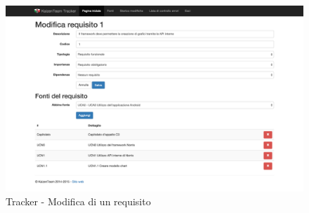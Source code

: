 \begin{figure}[H]
	\centering
	\includegraphics[width=\textwidth]{Pics/TrackerModificaRequisito}
	\caption{Tracker - Modifica di un requisito}
\end{figure}
